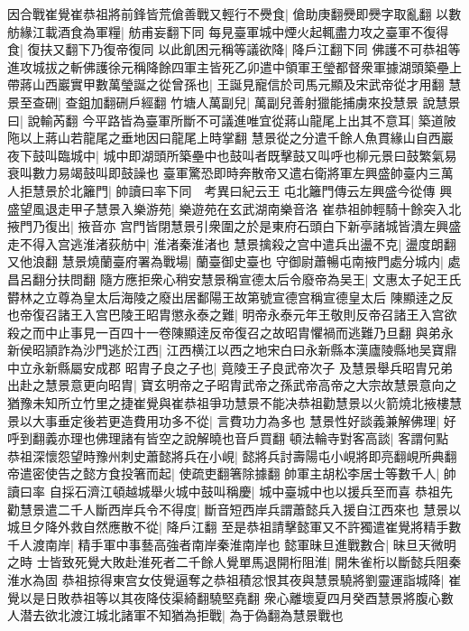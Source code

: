 因合戰崔覺崔恭祖將前鋒皆荒傖善戰又輕行不㸑食|{
	傖助庚翻㸑即㸑字取亂翻}
以數舫緣江載酒食為軍糧|{
	舫甫妄翻下同}
每見臺軍城中煙火起輒盡力攻之臺軍不復得食|{
	復扶又翻下乃復帝復同}
以此飢困元稱等議欲降|{
	降戶江翻下同}
佛護不可恭祖等進攻城拔之斬佛護徐元稱降餘四軍主皆死乙卯遣中領軍王瑩都督衆軍據湖頭築壘上帶蔣山西巖實甲數萬瑩誕之從曾孫也|{
	王誕見寵信於司馬元顯及宋武帝從才用翻}
慧景至查硎|{
	查鉏加翻硎戶經翻}
竹塘人萬副兒|{
	萬副兒善射獵能捕虜來投慧景}
說慧景曰|{
	說輸芮翻}
今平路皆為臺軍所斷不可議進唯宜從蔣山龍尾上出其不意耳|{
	築道陂陁以上蔣山若龍尾之垂地因曰龍尾上時掌翻}
慧景從之分遣千餘人魚貫緣山自西巖夜下鼓叫臨城中|{
	城中即湖頭所築壘中也鼓叫者既擊鼓又叫呼也柳元景曰鼓繁氣易衰叫數力易竭鼓叫即鼓譟也}
臺軍驚恐即時奔散帝又遣右衛將軍左興盛帥臺内三萬人拒慧景於北籬門|{
	帥讀曰率下同　考異曰紀云王屯北籬門傳云左興盛今從傳}
興盛望風退走甲子慧景入樂游苑|{
	樂遊苑在玄武湖南樂音洛}
崔恭祖帥輕騎十餘突入北掖門乃復出|{
	掖音亦}
宫門皆閉慧景引衆圍之於是東府石頭白下新亭諸城皆潰左興盛走不得入宫逃淮渚荻舫中|{
	淮渚秦淮渚也}
慧景擒殺之宫中遣兵出盪不克|{
	盪度朗翻又他浪翻}
慧景燒蘭臺府署為戰場|{
	蘭臺御史臺也}
守御尉蕭暢屯南掖門處分城内|{
	處昌呂翻分扶問翻}
隨方應拒衆心稍安慧景稱宣德太后令廢帝為吴王|{
	文惠太子妃王氏欎林之立尊為皇太后海陵之廢出居鄱陽王故第號宣德宫稱宣德皇太后}
陳顯逹之反也帝復召諸王入宫巴陵王昭胄懲永泰之難|{
	明帝永泰元年王敬則反帝召諸王入宫欲殺之而中止事見一百四十一卷陳顯逹反帝復召之故昭胄懼禍而逃難乃旦翻}
與弟永新侯昭頴詐為沙門逃於江西|{
	江西横江以西之地宋白曰永新縣本漢廬陵縣地吴寶鼎中立永新縣屬安成郡}
昭胄子良之子也|{
	竟陵王子良武帝次子}
及慧景舉兵昭胄兄弟出赴之慧景意更向昭胄|{
	寶玄明帝之子昭胄武帝之孫武帝高帝之大宗故慧景意向之}
猶豫未知所立竹里之捷崔覺與崔恭祖爭功慧景不能决恭祖勸慧景以火箭燒北掖樓慧景以大事垂定後若更造費用功多不從|{
	言費功力為多也}
慧景性好談義兼解佛理|{
	好呼到翻義亦理也佛理諸有皆空之說解曉也音戶買翻}
頓法輪寺對客高談|{
	客謂何點}
恭祖深懷怨望時豫州刺史蕭懿將兵在小峴|{
	懿將兵討壽陽屯小峴將即亮翻峴所典翻}
帝遣密使告之懿方食投箸而起|{
	使疏吏翻箸除據翻}
帥軍主胡松李居士等數千人|{
	帥讀曰率}
自採石濟江頓越城舉火城中鼓叫稱慶|{
	城中臺城中也以援兵至而喜}
恭祖先勸慧景遣二千人斷西岸兵令不得度|{
	斷音短西岸兵謂蕭懿兵入援自江西來也}
慧景以城旦夕降外救自然應散不從|{
	降戶江翻}
至是恭祖請擊懿軍又不許獨遣崔覺將精手數千人渡南岸|{
	精手軍中事藝高強者南岸秦淮南岸也}
懿軍昧旦進戰數合|{
	昧旦天微明之時}
士皆致死覺大敗赴淮死者二千餘人覺單馬退開桁阻淮|{
	開朱雀桁以斷懿兵阻秦淮水為固}
恭祖掠得東宫女伎覺逼奪之恭祖積忿恨其夜與慧景驍將劉靈運詣城降|{
	崔覺以是日敗恭祖等以其夜降伎渠綺翻驍堅堯翻}
衆心離壞夏四月癸酉慧景將腹心數人潜去欲北渡江城北諸軍不知猶為拒戰|{
	為于偽翻為慧景戰也}

